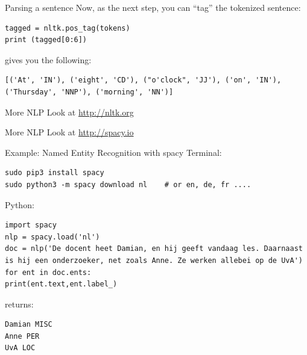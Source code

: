 \documentclass{beamer}
\begin{document}
\begin{frame}[fragile]{Parsing a sentence}
Now, as the next step, you can ``tag'' the tokenized sentence:
\begin{lstlisting}
tagged = nltk.pos_tag(tokens)
print (tagged[0:6])
\end{lstlisting}
gives you the following:
\begin{lstlisting}
[('At', 'IN'), ('eight', 'CD'), ("o'clock", 'JJ'), ('on', 'IN'),
('Thursday', 'NNP'), ('morning', 'NN')]
\end{lstlisting}


\end{frame}


\begin{frame}{More NLP}
\Huge{Look at \url{http://nltk.org}}

\end{frame}


\begin{frame}{More NLP}
\Huge{Look at \url{http://spacy.io}}
\end{frame}


\begin{frame}[fragile]{Example: Named Entity Recognition with spacy}
Terminal:

\begin{lstlisting}
sudo pip3 install spacy
sudo python3 -m spacy download nl    # or en, de, fr ....
\end{lstlisting}

Python:

\begin{lstlisting}
import spacy
nlp = spacy.load('nl')
doc = nlp('De docent heet Damian, en hij geeft vandaag les. Daarnaast is hij een onderzoeker, net zoals Anne. Ze werken allebei op de UvA')
for ent in doc.ents:
print(ent.text,ent.label_)
\end{lstlisting}

returns:

\begin{lstlisting}
Damian MISC
Anne PER
UvA LOC
\end{lstlisting}  

\end{frame}
\end{document}
